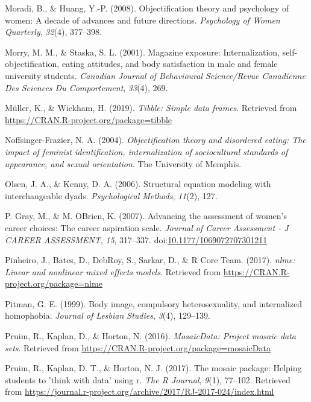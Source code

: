 \documentclass[
  man]{apa6}
\begin{document}
\leavevmode\hypertarget{ref-moradi2008}{}%
Moradi, B., \& Huang, Y.-P. (2008). Objectification theory and psychology of women: A decade of advances and future directions. \emph{Psychology of Women Quarterly}, \emph{32}(4), 377--398.

\leavevmode\hypertarget{ref-morry2001magazine}{}%
Morry, M. M., \& Staska, S. L. (2001). Magazine exposure: Internalization, self-objectification, eating attitudes, and body satisfaction in male and female university students. \emph{Canadian Journal of Behavioural Science/Revue Canadienne Des Sciences Du Comportement}, \emph{33}(4), 269.

\leavevmode\hypertarget{ref-R-tibble}{}%
Müller, K., \& Wickham, H. (2019). \emph{Tibble: Simple data frames}. Retrieved from \url{https://CRAN.R-project.org/package=tibble}

\leavevmode\hypertarget{ref-noffsinger2004objectification}{}%
Noffsinger-Frazier, N. A. (2004). \emph{Objectification theory and disordered eating: The impact of feminist identification, internalization of sociocultural standards of appearance, and sexual orientation}. The University of Memphis.

\leavevmode\hypertarget{ref-olsen2006structural}{}%
Olsen, J. A., \& Kenny, D. A. (2006). Structural equation modeling with interchangeable dyads. \emph{Psychological Methods}, \emph{11}(2), 127.

\leavevmode\hypertarget{ref-grayobrien2007}{}%
P. Gray, M., \& M. OBrien, K. (2007). Advancing the assessment of women's career choices: The career aspiration scale. \emph{Journal of Career Assessment - J CAREER ASSESSMENT}, \emph{15}, 317--337. doi:\href{https://doi.org/10.1177/1069072707301211}{10.1177/1069072707301211}

\leavevmode\hypertarget{ref-R-nlme}{}%
Pinheiro, J., Bates, D., DebRoy, S., Sarkar, D., \& R Core Team. (2017). \emph{nlme: Linear and nonlinear mixed effects models}. Retrieved from \url{https://CRAN.R-project.org/package=nlme}

\leavevmode\hypertarget{ref-pitman1999body}{}%
Pitman, G. E. (1999). Body image, compulsory heterosexuality, and internalized homophobia. \emph{Journal of Lesbian Studies}, \emph{3}(4), 129--139.

\leavevmode\hypertarget{ref-R-mosaicData}{}%
Pruim, R., Kaplan, D., \& Horton, N. (2016). \emph{MosaicData: Project mosaic data sets}. Retrieved from \url{https://CRAN.R-project.org/package=mosaicData}

\leavevmode\hypertarget{ref-R-mosaic}{}%
Pruim, R., Kaplan, D. T., \& Horton, N. J. (2017). The mosaic package: Helping students to 'think with data' using r. \emph{The R Journal}, \emph{9}(1), 77--102. Retrieved from \url{https://journal.r-project.org/archive/2017/RJ-2017-024/index.html}
\end{document}
